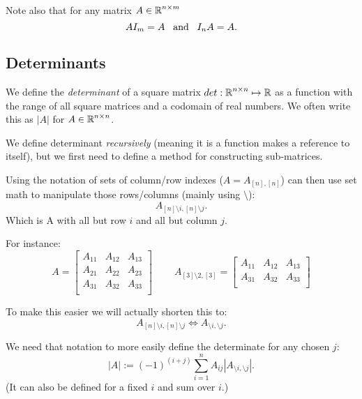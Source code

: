 Note also that for any matrix $A\in\operatorname{\mathbb{R}}^{n\times m}$ 
\[
AI_m = A \;\;\;\textnormal{and}\;\;\; I_nA = A.
\]


\subsection{Determinants}
We define the \emph{determinant} of a square matrix $det: \operatorname{\mathbb{R}}^{n\times n} \mapsto \operatorname{\mathbb{R}}$ 
as a function with the range of all square matrices and a codomain of real numbers. 
We often write this as $|A|$ for $A\in\operatorname{\mathbb{R}}^{n\times n}$. 

We define determinant \emph{recursively} (meaning it is a function makes a reference to itself), 
but we first need to define a method for constructing sub-matrices. 

Using the notation of sets of column/row indexes ($A = A_{[n],[n]}$) can then use set math to manipulate those rows/columns (mainly using $\setminus$): 
\[A_{[n]\setminus i,[n]\setminus j}.\]
Which is A with all but row $i$ and all but column $j$. 

For instance: 
\[A = \left[\begin{matrix}A_{11} & A_{12} & A_{13}\\ A_{21} & A_{22} & A_{23}\\ A_{31} & A_{32} & A_{33}\\\end{matrix}\right] \;\;\;\;\;\;\;\;
A_{[3]\setminus 2,[3]} = \left[\begin{matrix}A_{11} & A_{12} & A_{13}\\ A_{31} & A_{32} & A_{33}\\\end{matrix}\right]\]

To make this easier we will actually shorten this to: 
\[A_{[n]\setminus i,[n]\setminus j} \iff A_{\setminus i,\setminus j}.\]

We need that notation to more easily define the determinate for any chosen $j$:
\[
|A| := (-1)^{(i+j)} \sum_{i=1}^n A_{ij} \left|A_{\setminus i,\setminus j}\right|.
\]
(It can also be defined for a fixed $i$ and sum over $i$.)

